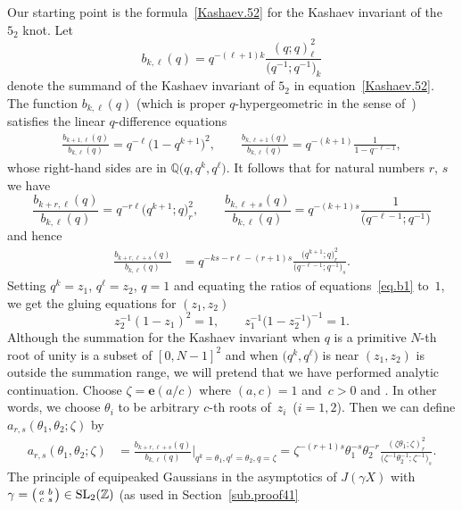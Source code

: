 \documentclass[pdftex]{sigma}
\numberwithin{equation}{section}
\def\BZ{\mathbb Z}
\def\BQ{\mathbb Q}
\def\SL{\mathrm{SL}}
\def\z{\zeta}
\def\e{\mathbf{e}}
\def\e{\mathbf{e}}
\def\z{\zeta}
\def\sma#1#2#3#4{\bigl(\smallmatrix#1&#2\\#3&#4\endsmallmatrix\bigr)} %
\def\J{\mathbf J} \def\J{J} %
\def\g{\gamma}
\def\th{\theta}
\begin{document}
Our starting point is the formula~\eqref{Kashaev.52} for the Kashaev invariant of the
$5_2$ knot.
Let
\[%
b_{k,\ell}(q) =q^{-(\ell+1)k} \frac{(q;q)_\ell^2}{\big(q^{-1};q^{-1}\big)_k}
\]
denote the summand of the Kashaev invariant of $5_2$ in
equation~\eqref{Kashaev.52}. The function $b_{k,\ell}(q)$ (which is proper
$q$-hypergeometric in the sense of~\cite{WZ})
satisfies the linear $q$-difference equations
\begin{gather}
\label{eq.b1}
\frac{b_{k+1,\ell}(q)}{b_{k,\ell}(q)} = q^{-\ell} \big(1-q^{k+1}\big)^2,
\qquad
\frac{b_{k,\ell+1}(q)}{b_{k,\ell}(q)} = q^{-(k+1)} \frac{1}{1-q^{-\ell-1}},
\end{gather}
whose right-hand sides are in $\BQ\big(q,q^k,q^\ell\big)$.
It follows that for natural numbers $r$, $s$ we have
\[%
\frac{b_{k+r,\ell}(q)}{b_{k,\ell}(q)} = q^{-r\ell} \big(q^{k+1};q\big)_r^2,
\qquad
\frac{b_{k,\ell+s}(q)}{b_{k,\ell}(q)} = q^{-(k+1)s} \frac{1}{\big(q^{-\ell-1};q^{-1}\big)}
\]
and hence
\begin{align*}
\frac{b_{k+r,\ell+s}(q)}{b_{k,\ell}(q)} &= q^{-k s -r \ell-(r+1)s}
\frac{\big(q^{k+1};q\big)_r^2}{\big(q^{-\ell-1};q^{-1}\big)_s} .
\end{align*}
Setting $q^k=z_1$, $q^\ell=z_2$, $q=1$ and equating the ratios of
equations~\eqref{eq.b1} to~$1$, we get the gluing equations for $(z_1,z_2)$
\begin{equation}
\label{eq.ge}
z_2^{-1}(1-z_1)^2=1, \qquad z_1^{-1}\big(1-z_2^{-1}\big)^{-1}=1 .
\end{equation}
Although the summation for the Kashaev invariant when $q$ is a primitive
$N$-th root of unity is a subset of $[0,N-1]^2$ and when $\big(q^k,q^\ell\big)$
is near $(z_1,z_2)$ is outside the summation range, we will pretend
that we have performed analytic continuation. Choose $\zeta=\e(a/c)$
where $(a,c)=1$ and~${c>0}$ and \smash{$(\th_1,\th_2)=\big(z_1^{1/c},z_2^{1/c}\big)$}.
In other words, we choose $\th_i$ to be arbitrary $c$-th roots of~$z_i$~($i=1,2$).
Then we can define $a_{r,s}(\th_1,\th_2;\z)$ by
\begin{align*}%
 a_{r,s}(\th_1,\th_2;\z)&=
\frac{b_{k+r,\ell+s}(q)}{b_{k,\ell}(q)} \big|_{q^k=\th_1, q^\ell=\th_2, q=\zeta} = \zeta^{-(r+1)s} \th_1^{-s} \th_2^{-r}
\frac{(\zeta \th_1;\zeta)_r^2 }{\big(\zeta^{-1}\th_2^{-1};\zeta^{-1}\big)_s} .
\end{align*}
The principle of equipeaked Gaussians in the asymptotics of $\J(\g X)$
with $\g=\sma abcs \in \SL_2(\BZ)$ (as used in Section~\ref{sub.proof41}
\end{document}
